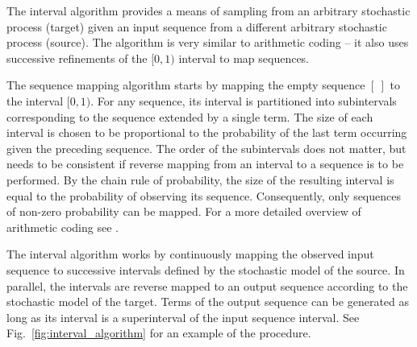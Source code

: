 \documentclass{IIBproject}
\begin{document}
The interval algorithm \cite{hanhoshi1997} provides a means of sampling from an arbitrary stochastic process (target) given an input sequence from a different arbitrary stochastic process (source). The algorithm is very similar to arithmetic coding -- it also uses successive refinements of the $[0,1)$ interval to map sequences.

The sequence mapping algorithm starts by mapping the empty sequence $[~]$ to the interval $[0,1)$. For any sequence, its interval is partitioned into subintervals corresponding to the sequence extended by a single term. The size of each interval is chosen to be proportional to the probability of the last term occurring given the preceding sequence. The order of the subintervals does not matter, but needs to be consistent if reverse mapping from an interval to a sequence is to be performed. By the chain rule of probability, the size of the resulting interval is equal to the probability of observing its sequence. Consequently, only sequences of non-zero probability can be mapped. For a more detailed overview of arithmetic coding see \cite{coverthomas:sfecoding}.

The interval algorithm works by continuously mapping the observed input sequence to successive intervals defined by the stochastic model of the source. In parallel, the intervals are reverse mapped to an output sequence according to the stochastic model of the target. Terms of the output sequence can be generated as long as its interval is a superinterval of the input sequence interval. See Fig.~\ref{fig:interval_algorithm} for an example of the procedure.
\end{document}
